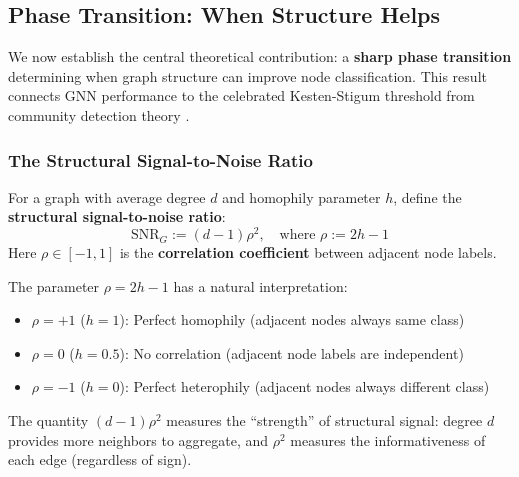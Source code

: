 
\subsection{Phase Transition: When Structure Helps}
\label{subsec:phase_transition}

We now establish the central theoretical contribution: a \textbf{sharp phase transition} determining when graph structure can improve node classification. This result connects GNN performance to the celebrated Kesten-Stigum threshold from community detection theory \cite{kesten1966additional,mossel2015reconstruction,massoulie2014community}.

\subsubsection{The Structural Signal-to-Noise Ratio}

\begin{definition}
\label{def:structural_snr}
For a graph with average degree $d$ and homophily parameter $h$, define the \textbf{structural signal-to-noise ratio}:
\begin{equation}
    \mathrm{SNR}_G := (d-1) \rho^2, \quad \text{where } \rho := 2h - 1
\end{equation}
Here $\rho \in [-1, 1]$ is the \textbf{correlation coefficient} between adjacent node labels.
\end{definition}

\begin{remark}
\label{rem:snr_interpretation}
The parameter $\rho = 2h - 1$ has a natural interpretation:
\begin{itemize}
    \item $\rho = +1$ ($h = 1$): Perfect homophily (adjacent nodes always same class)
    \item $\rho = 0$ ($h = 0.5$): No correlation (adjacent node labels are independent)
    \item $\rho = -1$ ($h = 0$): Perfect heterophily (adjacent nodes always different class)
\end{itemize}
The quantity $(d-1)\rho^2$ measures the ``strength'' of structural signal: degree $d$ provides more neighbors to aggregate, and $\rho^2$ measures the informativeness of each edge (regardless of sign).
\end{remark}

